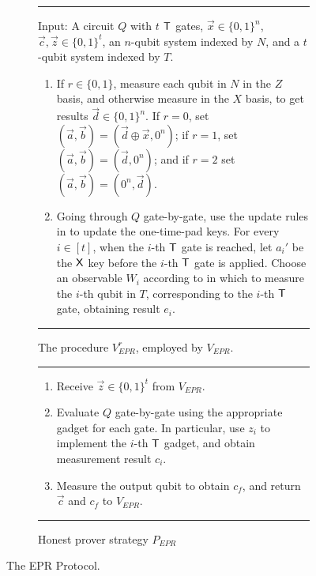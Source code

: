 \documentclass{toc}
\begin{document}
\begin{figure}[htbp]
\begin{subfigure}{\textwidth}
\rule[1ex]{\textwidth}{0.5pt}
\raggedright
Input: A circuit $Q$ with $t$ $\sf T$ gates, $\vec{x}\in\{0,1\}^n$, $\vec{c},\vec{z}\in\{0,1\}^t$, an $n$-qubit system indexed by $N$, and a $t$-qubit system indexed by $T$.
\begin{enumerate}
\item If $r\in\{0,1\}$, measure each qubit in $N$ in the $Z$ basis, and otherwise measure in the $X$ basis, to get results $\vec{d}\in\{0,1\}^n$. If $r=0$, set $(\vec{a},\vec{b})=(\vec{d}\oplus \vec{x},0^n)$; if $r=1$, set $(\vec{a},\vec{b})=(\vec{d},0^n)$; and if $r=2$ set $(\vec{a},\vec{b})=(0^n,\vec{d})$. 
\item Going through $Q$ gate-by-gate, use the update rules in
 to update the one-time-pad keys. For every
    $i\in[t]$, when the $i$-th $\sf T$ gate is reached, let $a_i'$ be the $\sf
    X$ key before the $i$-th $\sf T$ gate is applied. Choose an observable $W_i$ according to  in which to measure the $i$-th qubit in $T$, corresponding to the $i$-th $\sf T$ gate, obtaining result $e_i$.  
\end{enumerate}
\rule[2ex]{\textwidth}{0.5pt} %
\caption{ The procedure $V_{EPR}^r$, employed by $V_{EPR}$.  }
  \label{fig:original-protocol-VEPRr}
\end{subfigure}

\vspace{0.15cm}   %

\begin{subfigure}{\textwidth}
\rule[1ex]{\textwidth}{0.5pt}
\begin{enumerate}
\item Receive $\vec{z}\in\{0,1\}^t$ from $V_{EPR}$. 
\item Evaluate $Q$ gate-by-gate using the appropriate gadget for each gate.
In particular, use $z_i$ to implement the $i$-th $\sf T$ gadget, and obtain measurement result $c_i$. 
\item Measure the output qubit to obtain $c_f$, and return $\vec{c}$ and $c_f$ to $V_{EPR}$.
\end{enumerate}
\rule[2ex]{\textwidth}{0.5pt}\vspace{-.5cm}
\caption{Honest prover strategy $P_{EPR}$}
  \label{fig:original-protocol-PEPR}
\end{subfigure}
  
  \caption{The EPR Protocol.  }\label{fig:original-protocol}
\end{figure}
\end{document}
